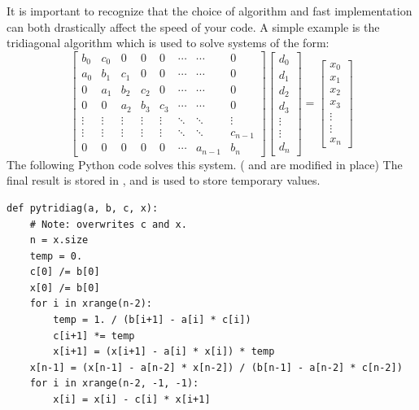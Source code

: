 It is important to recognize that the choice of algorithm and fast implementation can both drastically affect the speed of your code.
A simple example is the tridiagonal algorithm which is used to solve systems of the form:
\[\begin{bmatrix}
b_0 & c_0 & 0 & 0 & 0 & \cdots & \cdots & 0 \\
a_0 & b_1 & c_1 & 0 & 0 & \cdots & \cdots & 0 \\
0 & a_1 & b_2 & c_2 & 0 & \cdots & \cdots & 0 \\
0 & 0 & a_2 & b_3 & c_3 & \cdots & \cdots & 0 \\
\vdots & \vdots & \vdots & \vdots & \vdots & \ddots & \ddots & \vdots \\
\vdots & \vdots & \vdots & \vdots & \vdots & \ddots & \ddots & c_{n-1} \\
0 & 0 & 0 & 0 & 0 & \cdots & a_{n-1} & b_n
\end{bmatrix}
\begin{bmatrix}
d_0\\
d_1\\
d_2\\
d_3\\
\vdots\\
\vdots\\
d_n
\end{bmatrix}
=
\begin{bmatrix}
x_0\\
x_1\\
x_2\\
x_3\\
\vdots\\
\vdots\\
x_n
\end{bmatrix}\]
The following Python code solves this system.
( and  are modified in place)
The final result is stored in , and  is used to store temporary values.
\begin{lstlisting}
def pytridiag(a, b, c, x):
    # Note: overwrites c and x.
    n = x.size
    temp = 0.
    c[0] /= b[0]
    x[0] /= b[0]
    for i in xrange(n-2):
        temp = 1. / (b[i+1] - a[i] * c[i])
        c[i+1] *= temp
        x[i+1] = (x[i+1] - a[i] * x[i]) * temp
    x[n-1] = (x[n-1] - a[n-2] * x[n-2]) / (b[n-1] - a[n-2] * c[n-2])
    for i in xrange(n-2, -1, -1):
        x[i] = x[i] - c[i] * x[i+1]
\end{lstlisting}

